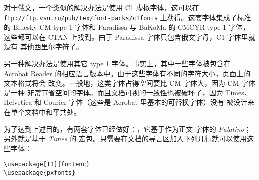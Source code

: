 对于俄文，一个类似的解决办法是使用 C1 虚拟字体，这可以在 \texttt{ftp://ftp.vsu.ru/pub/tex/font-packs/c1fonts} 
上获得。这套字体集成了标准的 Bluesky CM type 1 字体和 Paradissa 
与 BaKoMa 的 CMCYR
type 1 字体，这些都可以在 CTAN 上找到。由于 Paradissa 字体只包含俄文字母，C1 字体里就没有
其他西里尔字符了。


另一种解决办法是使用其它 \PSi{}
type 1 字体。事实上，其中一些字体被包含在 Acrobat
Reader 的相应语言版本中。由于这些字体有不同的字符大小，页面上的文本格式将会
改变。一般地，这类字体占得空间要比 CM 字体大，因为 CM 字体是一种
非常节省空间的字体。而且文档可视的一致性也被破坏了，因为 Times、
Helvetica 和 Courier 字体（这些是 Acrobat 里基本的可替换字体）没有
被设计来在单个文档中和平共处。


为了达到上述目的，有两套字体已经做好：，它基于作为正文
字体的 \emph{Palatino}；另外就是基于 \emph{Times} 的  宏包。只需要在文档的导言区加入下列几行就可以使用这些字体：
\begin{code}
\begin{verbatim}
\usepackage[T1]{fontenc}
\usepackage{pxfonts}
\end{verbatim}
\end{code}


